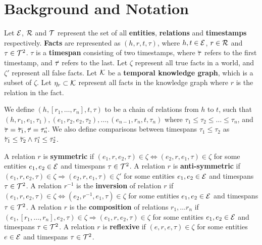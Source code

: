 \section{Background and Notation}
\label{sec:background-and-notation}

Let $\mathcal{E}$, $\mathcal{R}$ and $\mathcal{T}$ represent the set of all \textbf{entities}, \textbf{relations} and \textbf{timestamps} respectively. \textbf{Facts} are represented as $(h, r, t, \tau)$, where $h, t \in \mathcal{E}$, $r \in \mathcal{R}$ and $\tau \in \mathcal{T}^2$. $\tau$ is a \textbf{timespan} consisting of two timestamps, where $\timebegin{\tau}$ refers to the first timestamp, and $\timeend{\tau}$ refers to the last. Let $\zeta$ represent all true facts in a world, and $\zeta'$ represent all false facts. Let $\mathcal{K}$ be a \textbf{temporal knowledge graph}, which is a subset of $\zeta$. Let $\eta_r \subset \mathcal{K}$ represent all facts in the knowledge graph where $r$ is the relation in the fact.

We define $(h, [r_1, \dots, r_n], t, \tau)$ to be a chain of relations from $h$ to $t$, such that $(h, r_1, e_1, \tau_1), (e_1, r_2, e_2, \tau_2), \dots, (e_{n-1}, r_n, t, \tau_n)$ where $\tau_1 \leq \tau_2 \leq \dots \leq \tau_n$, and $\timebegin{\tau} = \timebegin{\tau_1}, \timeend{\tau} = \timeend{\tau_n}$. We also define comparisons between timespans $\tau_1 \leq \tau_2$ as $\timebegin{\tau_1} \leq \timebegin{\tau_2} \wedge \timeend{\tau_1} \leq \timeend{\tau_2}$.

A relation $r$ is \textbf{symmetric} if $(e_1, r, e_2, \tau) \in \zeta \Leftrightarrow (e_2, r, e_1, \tau) \in \zeta$ for some entities $e_1, e_2 \in \mathcal{E}$ and timespans $\tau \in \mathcal{T}^2$.
A relation $r$ is \textbf{anti-symmetric} if $(e_1, r, e_2, \tau) \in \zeta \Rightarrow (e_2, r, e_1, \tau) \in \zeta'$ for some entities $e_1, e_2 \in \mathcal{E}$ and timespans $\tau \in \mathcal{T}^2$.
A relation $r^{-1}$ is the \textbf{inversion} of relation $r$ if $(e_1, r, e_2, \tau) \in \zeta \Leftrightarrow (e_2, r^{-1}, e_1, \tau) \in \zeta$ for some entities $e_1, e_2 \in \mathcal{E}$ and timespans $\tau \in \mathcal{T}^2$.
A relation $r$ is the \textbf{composition} of relations $r_1, \dots r_n$ if $(e_1, [r_1, \dots, r_n], e_2, \tau) \in \zeta \Rightarrow (e_1, r, e_2, \tau) \in \zeta$ for some entities $e_1, e_2 \in \mathcal{E}$ and timespans $\tau \in \mathcal{T}^2$.
A relation $r$ is \textbf{reflexive} if $(e, r, e, \tau) \in \zeta$ for some entities $e \in \mathcal{E}$ and timespans $\tau \in \mathcal{T}^2$.
